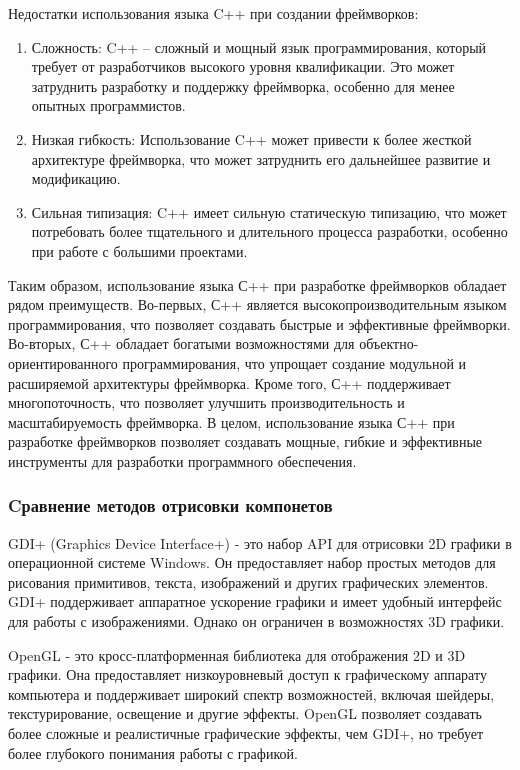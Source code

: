 Недостатки использования языка C++ при создании фреймворков:
\begin{enumerate}
\item Сложность: C++ – сложный и мощный язык программирования, который требует от разработчиков высокого уровня квалификации. Это может затруднить разработку и поддержку фреймворка, особенно для менее опытных программистов.
\item Низкая гибкость: Использование C++ может привести к более жесткой архитектуре фреймворка, что может затруднить его дальнейшее развитие и модификацию.
\item Сильная типизация: C++ имеет сильную статическую типизацию, что может потребовать более тщательного и длительного процесса разработки, особенно при работе с большими проектами.
\end{enumerate}

Таким образом, использование языка С++ при разработке фреймворков обладает рядом преимуществ. Во-первых, С++ является высокопроизводительным языком программирования, что позволяет создавать быстрые и эффективные фреймворки. Во-вторых, С++ обладает богатыми возможностями для объектно-ориентированного программирования, что упрощает создание модульной и расширяемой архитектуры фреймворка. Кроме того, С++ поддерживает многопоточность, что позволяет улучшить производительность и масштабируемость фреймворка. В целом, использование языка С++ при разработке фреймворков позволяет создавать мощные, гибкие и эффективные инструменты для разработки программного обеспечения.

\subsubsection{Cравнение методов отрисовки компонетов}

GDI+ (Graphics Device Interface+) - это набор API для отрисовки 2D графики в операционной системе Windows. Он предоставляет набор простых методов для рисования примитивов, текста, изображений и других графических элементов. GDI+ поддерживает аппаратное ускорение графики и имеет удобный интерфейс для работы с изображениями. Однако он ограничен в возможностях 3D графики.

OpenGL\cite{gl} - это кросс-платформенная библиотека для отображения 2D и 3D графики. Она предоставляет низкоуровневый доступ к графическому аппарату компьютера и поддерживает широкий спектр возможностей, включая шейдеры, текстурирование, освещение и другие эффекты. OpenGL позволяет создавать более сложные и реалистичные графические эффекты, чем GDI+, но требует более глубокого понимания работы с графикой.

